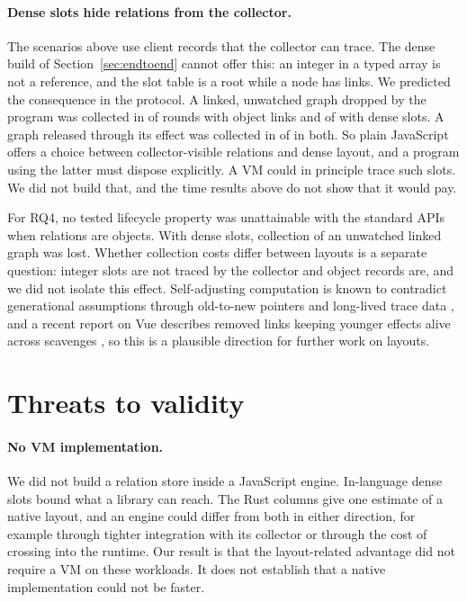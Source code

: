 \documentclass[11pt]{article}
\begin{document}
\begin{table}[tbp]
\centering
\footnotesize

\caption{Effect of \texttt{deref} polling on the clearing of a single weakly held target.}
\label{tab:observer}
\end{table}

\paragraph{Dense slots hide relations from the collector.} The scenarios above use client records that the collector can trace. The dense build of Section~\ref{sec:endtoend} cannot offer this: an integer in a typed array is not a reference, and the slot table is a root while a node has links. We predicted the consequence in the protocol. A linked, unwatched graph dropped by the program was collected in \mSixFrozenDropped{} of \mSixProbeRounds{} rounds with object links and \mSixDenseDropped{} of \mSixProbeRounds{} with dense slots. A graph released through its effect was collected in \mSixDenseDisposed{} of \mSixProbeRounds{} in both. So plain JavaScript offers a choice between collector-visible relations and dense layout, and a program using the latter must dispose explicitly. A VM could in principle trace such slots. We did not build that, and the time results above do not show that it would pay.

For RQ4, no tested lifecycle property was unattainable with the standard APIs when relations are objects. With dense slots, collection of an unwatched linked graph was lost. Whether collection costs differ between layouts is a separate question: integer slots are not traced by the collector and object records are, and we did not isolate this effect. Self-adjusting computation is known to contradict generational assumptions through old-to-new pointers and long-lived trace data \cite{acar2009,hammer2008}, and a recent report on Vue describes removed links keeping younger effects alive across scavenges \cite{vue16176}, so this is a plausible direction for further work on layouts.

\section{Threats to validity}
\label{sec:threats}

\paragraph{No VM implementation.} We did not build a relation store inside a JavaScript engine. In-language dense slots bound what a library can reach. The Rust columns give one estimate of a native layout, and an engine could differ from both in either direction, for example through tighter integration with its collector or through the cost of crossing into the runtime. Our result is that the layout-related advantage did not require a VM on these workloads. It does not establish that a native implementation could not be faster.
\end{document}
